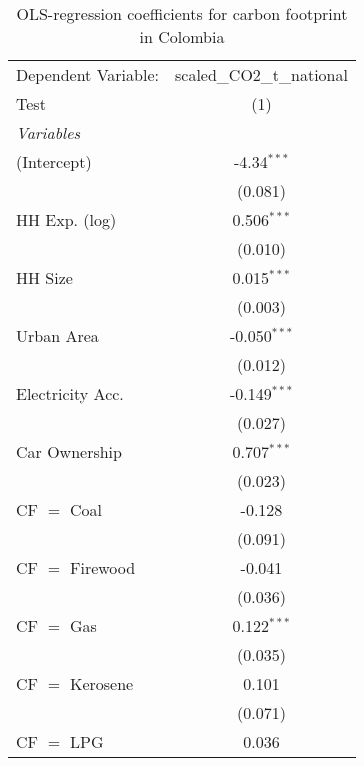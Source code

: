 
\begin{table}[htbp!]
   \centering
   \small
   \begin{adjustbox}{width = 1\textwidth, max height = 0.95\textheight, center}
      \begin{threeparttable}[b]
         \caption{\label{tab:OLS_2_COL} OLS-regression coefficients for carbon footprint in Colombia}
         \begin{tabular}{lc}
            \tabularnewline \midrule \midrule
            Dependent Variable: & scaled\_CO2\_t\_national\\     
            Test                & (1)\\  
            \midrule
            \emph{Variables}\\
            (Intercept)         & -4.34$^{***}$\\   
                                & (0.081)\\   
            HH Exp. (log)       & 0.506$^{***}$\\   
                                & (0.010)\\   
            HH Size             & 0.015$^{***}$\\   
                                & (0.003)\\   
            Urban Area          & -0.050$^{***}$\\   
                                & (0.012)\\   
            Electricity Acc.    & -0.149$^{***}$\\   
                                & (0.027)\\   
            Car Ownership       & 0.707$^{***}$\\   
                                & (0.023)\\   
            CF $=$ Coal         & -0.128\\   
                                & (0.091)\\   
            CF $=$ Firewood     & -0.041\\   
                                & (0.036)\\   
            CF $=$ Gas          & 0.122$^{***}$\\   
                                & (0.035)\\   
            CF $=$ Kerosene     & 0.101\\   
                                & (0.071)\\   
            CF $=$ LPG          & 0.036\\   

\end{tabular}
\end{threeparttable}
\end{adjustbox}
\end{table}
